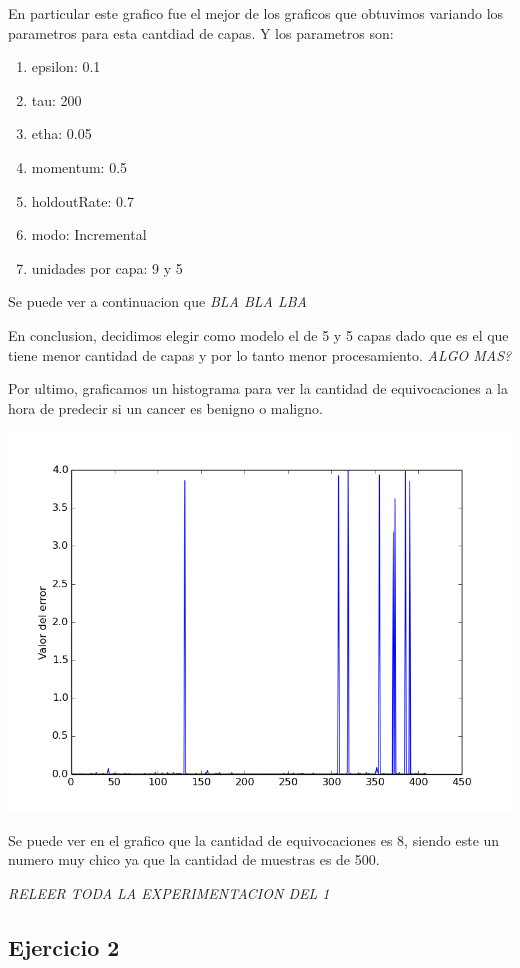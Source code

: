 En particular este grafico fue el mejor de los graficos que obtuvimos variando los parametros para esta cantdiad de capas. Y los parametros son:
\begin{enumerate}
\item epsilon: 0.1
\item tau: 200
\item etha: 0.05
\item momentum: 0.5
\item holdoutRate: 0.7
\item modo: Incremental
\item unidades por capa: 9 y 5
\end{enumerate}

Se puede ver a continuacion que \emph{\color{red} BLA BLA LBA}

En conclusion, decidimos elegir como modelo el de 5 y 5 capas dado que es el que tiene menor cantidad de capas y por lo tanto menor procesamiento. \emph{\color{red} ALGO MAS?}

Por ultimo, graficamos un histograma para ver la cantidad de equivocaciones a la hora de predecir si un cancer es benigno o maligno.

\begin{center}
\includegraphics[scale=0.5]{img/histogramaej155}
\end{center}

Se puede ver en el grafico que la cantidad de equivocaciones es 8, siendo este un numero muy chico ya que la cantidad de muestras es de 500.


\emph{\color{red} RELEER TODA LA EXPERIMENTACION DEL 1}
\subsection{Ejercicio 2}

